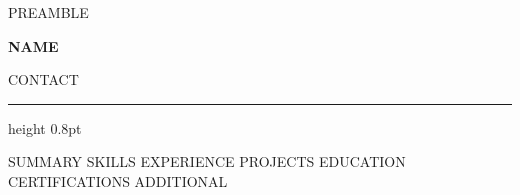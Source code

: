 %
{{PREAMBLE}}


\renewcommand{\cvsectionfont}[1]{{\large\bfseries #1}}
\renewcommand{\cvsectionrule}{\vspace{1.5pt}\hrule height 0.55pt\relax}

\renewcommand{\cvheader}[2]{%
  {\fontsize{22}{26}\selectfont\bfseries #1}\par\vspace{2pt}%
  {\small\color{cvmuted} #2}\par\vspace{3pt}%
  \hrule height 0.8pt\relax
  \vspace{4pt}%
}



\cvheader{ {{NAME}} }{ {{CONTACT}} }

{{SUMMARY}}
{{SKILLS}}
{{EXPERIENCE}}
{{PROJECTS}}
{{EDUCATION}}
{{CERTIFICATIONS}}
{{ADDITIONAL}}


